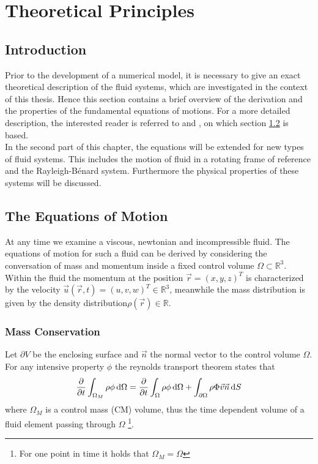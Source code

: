 \chapter{Theoretical Principles}

\section{Introduction}

Prior to the development of a numerical model, it is necessary to give an exact theoretical description of the
fluid systems, which are investigated in the context of this thesis.
Hence this section contains a brief overview of the derivation and the properties of the fundamental equations of motions.
For a more detailed description, the interested reader is referred to \citep{ferziger99} and \citep{tritton88}, on which section \ref{theorie:eqm1} is based.\\
In the second part of this chapter, the equations will be extended for new types of fluid systems.
This includes the motion of fluid in a rotating frame of reference and the Rayleigh-B\'{e}nard system.
Furthermore the physical properties of these systems will be discussed.

\section{The Equations of Motion}\label{theorie:eqm1}

At any time we examine a viscous, newtonian and incompressible fluid. The equations of motion for such a fluid can be derived by considering the conversation of
mass and momentum inside a fixed control volume $\Omega \subset \mathbb{R}^3$.
Within the fluid the momentum at the position $\vec{r} = (x, y, z)^T$  is  characterized by the velocity $\vec{u}(\vec{r}, t) = (u, v, w)^T \in \mathbb{R}^3$,
meanwhile the mass distribution is given by the density distribution$\rho(\vec{r}) \in \mathbb{R}$.

\subsection{Mass Conservation}

Let $\partial V$ be the enclosing surface and $\vec{n}$ the normal vector to the control volume $\Omega$.
For any intensive property $\phi$ the reynolds transport theorem states that
\begin{align}
    \pdn[]{t} \int_{\Omega_M} \rho \phi \dif \Omega = \pdn[]{t}\int_{\Omega} \rho \phi \dif \Omega + \int_{\partial\Omega} \rho \Phi \vec{v} \vec{n} \dif S
\end{align}
where $\Omega_M$ is a control mass (CM) volume, thus the time dependent volume of a fluid element passing through $\Omega$
\footnote{For one point in time it holds that $\Omega_M = \Omega$}.

